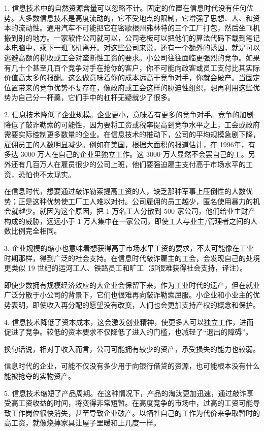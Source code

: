 1. 信息技术中的自然资源含量可以忽略不计。固定的位置在信息时代没有任何优势。大多数信息技术是高度流动的，它不受地点的限制，它增强了思想、人、和资本的流动性。通用汽车不可能把它在密歇根州弗林特的三个工厂打包，然后坐飞机搬到别的地方。一家软件公司就可以，公司老板可以把他们的算法代码下载到笔记本电脑中，乘下一班飞机离开。对这些公司来说，还有一个额外的诱因，就是可以逃避高额的税收或工会对垄断性工资的要求。小公司往往面临更强烈的竞争。如果有几十个甚至几百个竞争对手在抢你的客户，你不可能向政客或员工支付比其实际价值高太多的报酬。这么做意味着你的成本远高于竞争对手，你就会破产。当固定位置带来的竞争优势不复存在，像政府或工会这样的胁迫性组织，想再利用这些优势为自己分一杯羹，它们手中的杠杆无疑就少了很多。

2. 信息技术降低了企业规模。企业更小，意味着有更多的竞争对手。竞争的加剧降低了敲诈勒索的可能性，因为要将工资或税率提高到竞争水平之上，工会或政府需要实际控制更多数量的企业。在信息技术的推动下，公司的平均规模急剧下降，雇佣员工的人数明显减少。例如在美国，根据大面积的报道估计，在 1996年，有多达 3000 万人在自己的企业里独立工作。这 3000 万人显然不会罢自己的工。另外还有几百万人在雇员很少的公司上班，他们要强迫雇主支付高于市场水平的工资，恐怕也不太现实。

在信息时代，想要通过敲诈勒索提高工资的人，缺乏那种军事上压倒性的人数优势；正是这种优势使工厂工人难以对付。公司雇佣的员工越少，匿名使用暴力的机会就越少。就因为这个原因，把 1 万名工人分散到 500 家公司，他们给业主财产构成的威胁，远远小于 1 万人集中在一家公司，即使工人与业主/管理者之间的人数比例完全相同。

3. 企业规模的缩小也意味着想获得高于市场水平工资的要求，不太可能像在工业时期那样，得到广泛的社会支持。在信息时代敲诈雇主的工会，会发现自己的处境更类似 19 世纪的运河工人、铁路员工和旷工（即很难获得社会支持，译注）。

即使少数拥有规模经济效应的大企业会保留下来，作为工业时代的遗产，但在就业广泛分散于小公司的背景下，它们也很难再向敲诈勒索屈服。小企业和小业主的优势表明，即使收入再分配的愿望没有改变，人们也会更加支持产权的概念和保护。

4. 信息技术降低了资本成本，这会激发创业精神，使更多人可以独立工作，进而促进了竞争。较低的资本要求不仅降低了进入的门槛，也减轻了“退出的障碍”。

换句话说，相对于收入而言，公司可能拥有较少的资产，承受损失的能力也较弱。

信息时代的企业，可能不仅没有多少用于向银行借贷的资源，也可能根本没有什么能被抢夺的实物资产。

5. 信息技术缩短了产品周期。在这种情况下，产品的淘汰更加迅速，通过敲诈享受高工资收益的时间，将变得非常短暂。在高度竞争的市场中，过高的工资可能导致工作岗位很快消失，甚至导致企业破产。以牺牲自己的工作为代价来争取暂时的高工资，就像烧掉家具让屋子里暖和上几度一样。

